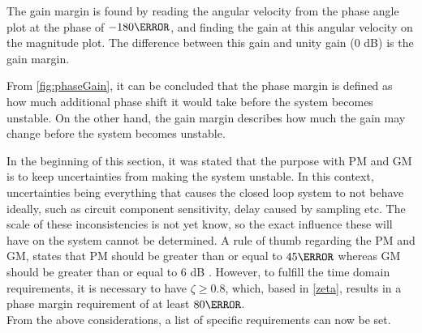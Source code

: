 The gain margin is found by reading the angular velocity from the phase angle plot at the phase of $-180\degree$, and finding the gain at this angular velocity on the magnitude plot. The difference between this gain and unity gain (0 dB) is the gain margin.

From \autoref{fig:phaseGain}, it can be concluded that the phase margin is defined as how much additional phase shift it would take before the system becomes unstable. On the other hand, the gain margin describes how much the gain may change before the system becomes unstable.

In the beginning of this section, it was stated that the purpose with PM and GM is to keep uncertainties from making the system unstable. In this context, uncertainties being everything that causes the closed loop system to not behave ideally, such as circuit component sensitivity, delay caused by sampling etc. The scale of these inconsistencies is not yet know, so the exact influence these will have on the system cannot be determined. A rule of thumb regarding the PM and GM, states that PM should be greater than or equal to $45\degree$ whereas GM should be greater than or equal to 6 dB \citep{sou:PmGm}. However, to fulfill the time domain requirements, it is necessary to have $\zeta \geq 0.8$, which, based in \autoref{zeta}, results in a phase margin requirement of at least $80 \degree$.\\
From the above considerations, a list of specific requirements can now be set.